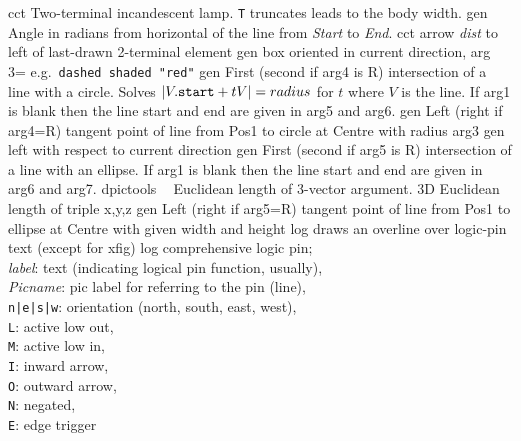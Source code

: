 %
  {cct}%
  {Two-terminal incandescent lamp. {\tt T} truncates leads to the body width.
   }%
%
  {gen}%
  {Angle in radians from horizontal of the line from {\sl Start}
  to {\sl End}.}%
%
  {cct}%
  {arrow {\sl dist} to left of last-drawn 2-terminal element
   }%
%
  {gen}%
  {box oriented in current direction, arg 3= e.g.\ {\tt dashed shaded "red"}}%
%
  {gen}%
  { First (second if arg4 is R) intersection of a line with a circle.
    Solves $|V.{\tt start} + tV| = {\sl radius}$ for $t$ where $V$ is the line.
    If arg1 is blank then the line start and end are given in arg5 and arg6.}%
%
  {gen}%
  { Left (right if arg4=R) tangent point of line
     from Pos1 to circle at Centre with radius arg3}%
%
  {gen}%
  {left with respect to current direction }%
%
  {gen}%
  { First (second if arg5 is R) intersection of a line with an ellipse.
    If arg1 is blank then the line start and end are given in arg6 and arg7.}%
%
  {dpictools}%
  {$\;\;$ Euclidean length of 3-vector argument.}%
%
  {3D}%
  {Euclidean length of triple x,y,z}%
%
  {gen}%
  { Left (right if arg5=R) tangent point of line
     from Pos1 to ellipse at Centre with given width and height}%
%
  {log}%
  {draws an overline over logic-pin text (except for xfig)}%
%
  {log}%
  {comprehensive logic pin;\\
   {\sl label}: text (indicating logical pin function, usually),\\
   {\sl Picname}: pic label for referring to the pin (line),\\
   {\tt n|e|s|w}: orientation (north, south, east, west),\\
   {\tt L}: active low out,\\
   {\tt M}: active low in,\\
   {\tt I}: inward arrow,\\
   {\tt O}: outward arrow,\\
   {\tt N}: negated,\\
   {\tt E}: edge trigger}%
